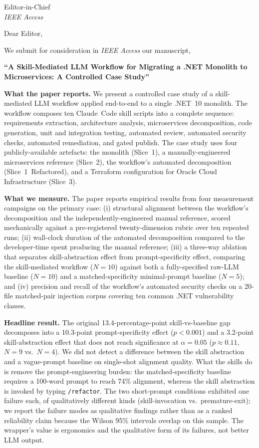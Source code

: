 \documentclass[11pt, a4paper]{letter}
\date{\today}
\begin{document}
\begin{letter}{%
  Editor-in-Chief\\
  \textit{IEEE Access}
}

\opening{Dear Editor,}

We submit for consideration in \textit{IEEE Access} our manuscript,

\begin{center}
  \textbf{``A Skill-Mediated LLM Workflow for Migrating a .NET Monolith
  to Microservices: A Controlled Case Study''}
\end{center}

\textbf{What the paper reports.}
We present a controlled case study of a skill-mediated LLM workflow
applied end-to-end to a single .NET~10 monolith.  The workflow
composes ten Claude~Code skill scripts into a complete sequence:
requirements extraction, architecture analysis, microservices
decomposition, code generation, unit and integration testing,
automated review, automated security checks, automated remediation,
and gated publish.  The case study uses four publicly-available
artefacts: the monolith (Slice~1), a manually-engineered microservices
reference (Slice~2), the workflow's automated decomposition
(Slice~1~Refactored), and a Terraform configuration for Oracle Cloud
Infrastructure (Slice~3).

\textbf{What we measure.}
The paper reports empirical results from four measurement campaigns
on the primary case:
(i) structural alignment between the workflow's decomposition and the
independently-engineered manual reference, scored mechanically against
a pre-registered twenty-dimension rubric over ten repeated runs;
(ii) wall-clock duration of the automated decomposition compared to
the developer-time spent producing the manual reference;
(iii) a three-way ablation that separates skill-abstraction effect
from prompt-specificity effect, comparing the skill-mediated workflow
($N{=}10$) against both a fully-specified raw-LLM baseline ($N{=}10$)
and a matched-specificity minimal-prompt baseline ($N{=}5$); and
(iv) precision and recall of the workflow's automated security
checks on a 20-file matched-pair injection corpus covering ten common
.NET vulnerability classes.

\textbf{Headline result.}
The original 13.4-percentage-point skill-vs-baseline gap decomposes
into a 10.3-point prompt-specificity effect ($p < 0.001$) and a
3.2-point skill-abstraction effect that does not reach significance
at $\alpha{=}0.05$ ($p \approx 0.11$, $N{=}9$ vs.\ $N{=}4$). We did
not detect a difference between the skill abstraction and a
vague-prompt baseline on single-shot alignment quality. What the
skills do is remove the prompt-engineering burden: the
matched-specificity baseline requires a 100-word prompt to reach
74\% alignment, whereas the skill abstraction is invoked by typing
\texttt{/refactor}. The two short-prompt conditions exhibited one
failure each, of qualitatively different kinds (skill-invocation
vs.\ premature-exit); we report the failure modes as qualitative
findings rather than as a ranked reliability claim because the
Wilson 95\% intervals overlap on this sample. The wrapper's value
is ergonomics and the qualitative form of its failures, not better
LLM output.


\end{letter}
\end{document}
